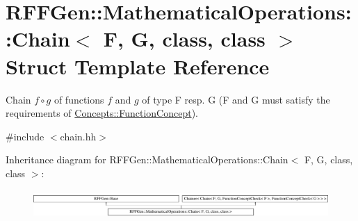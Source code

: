 \hypertarget{structRFFGen_1_1MathematicalOperations_1_1Chain}{\section{R\-F\-F\-Gen\-:\-:Mathematical\-Operations\-:\-:Chain$<$ F, G, class, class $>$ Struct Template Reference}
\label{structRFFGen_1_1MathematicalOperations_1_1Chain}
}


Chain $ f\circ g $ of functions $f$ and $g$ of type F resp. G (F and G must satisfy the requirements of \hyperlink{structRFFGen_1_1Concepts_1_1FunctionConcept}{Concepts\-::\-Function\-Concept}).  




{\ttfamily \#include $<$chain.\-hh$>$}

Inheritance diagram for R\-F\-F\-Gen\-:\-:Mathematical\-Operations\-:\-:Chain$<$ F, G, class, class $>$\-:\begin{figure}[H]
\begin{center}
\leavevmode
\includegraphics[height=1.078998cm]{structRFFGen_1_1MathematicalOperations_1_1Chain}
\end{center}
\end{figure}
